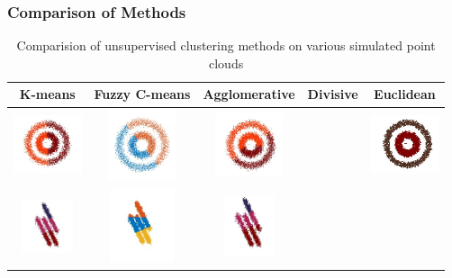 \documentclass[12pt]{drexelthesis}
\let\Oldsubsubsection\subsubsection
\renewcommand{\subsubsection}{\FloatBarrier\Oldsubsubsection}
\begin{document}
\subsubsection{Comparison of Methods}

 \begin{table}[h!]
     \centering
           \caption[Comparison of Unsupervised clustering methods]{\centering Comparision of unsupervised clustering methods on various simulated point clouds}
     \begin{tabular}{ | c | c | c | c | c | }
     \hline
      K-means & Fuzzy C-means & Agglomerative & Divisive & Euclidean \\ 
      \hline
      		\includegraphics[width=2cm]{2d-cluster-tests/k-means/concentric.jpg}
      & 
      		\includegraphics[trim={0 1cm 0 1cm},clip, width=2cm]{2d-cluster-tests/fcm/concentric.jpg}
      & 
      		\includegraphics[width=2cm]{2d-cluster-tests/agglomerative/concentric.jpg}
      &

      &
      		\includegraphics[width=2cm]{2d-cluster-tests/euclidean-distance/concentric.jpg}
      \\ \hline
      
            \includegraphics[width=1.5cm]{2d-cluster-tests/k-means/lines.jpg}
      & 
             \includegraphics[trim={0 1cm 0 0.5cm},clip,width=1.9cm]{2d-cluster-tests/fcm/lines.jpg}    
      & 
             \includegraphics[trim={0 1cm 0 0cm},clip,width=1.5cm]{2d-cluster-tests/agglomerative/lines.jpg}    
      &


\end{tabular}
\end{table}
\end{document}
